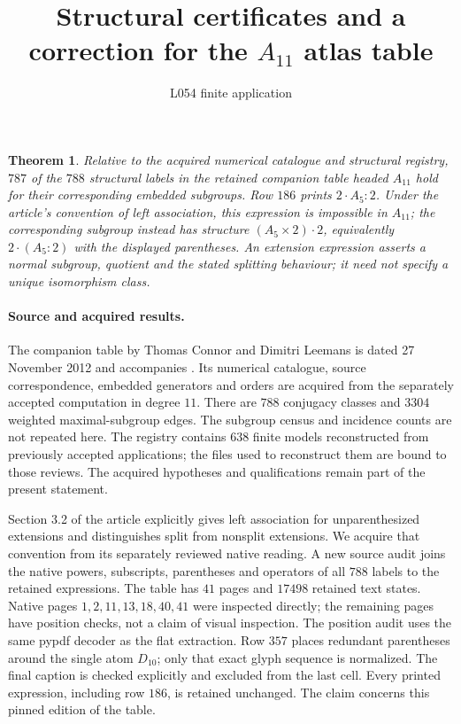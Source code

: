 \documentclass[11pt]{article}
\title{Structural certificates and a correction for the $A_{11}$ atlas table}
\author{L054 finite application}\date{}
\newtheorem{theorem}{Theorem}
\begin{document}
\maketitle

\begin{theorem}
Relative to the acquired numerical catalogue and structural registry,
$787$ of the $788$ structural labels in the retained companion table
headed $A_{11}$ hold for their corresponding embedded subgroups.
Row $186$ prints $2\cdot A_5:2$. Under the article's convention of left
association, this expression is impossible in $A_{11}$; the corresponding
subgroup instead has structure $(A_5\times2)\cdot2$, equivalently
$2\cdot(A_5:2)$ with the displayed parentheses.
An extension expression asserts a normal subgroup, quotient and the
stated splitting behaviour; it need not specify a unique isomorphism class.
\end{theorem}

\paragraph{Source and acquired results.}
The companion table by Thomas Connor and Dimitri Leemans is dated
27 November 2012 and accompanies \cite{atlas}. Its numerical catalogue,
source correspondence, embedded generators and orders are acquired from
the separately accepted computation in degree $11$. There are $788$
conjugacy classes and $3304$ weighted maximal-subgroup edges. The subgroup
census and incidence counts are not repeated here. The registry contains
$638$ finite models reconstructed from previously accepted applications;
the files used to reconstruct them are bound to those reviews. The acquired
hypotheses and qualifications remain part of the present statement.

Section 3.2 of the article explicitly gives left association for
unparenthesized extensions and distinguishes split from nonsplit
extensions. We acquire that convention from its separately reviewed native
reading. A new source audit joins the native powers, subscripts,
parentheses and operators of all $788$ labels to the retained expressions.
The table has $41$ pages and $17498$ retained text states. Native pages
$1,2,11,13,18,40,41$ were inspected directly; the remaining pages have
position checks, not a claim of visual inspection. The position audit uses
the same pypdf decoder as the flat extraction. Row $357$ places redundant
parentheses around the single atom $D_{10}$; only that exact glyph sequence
is normalized. The final caption is checked explicitly and excluded from
the last cell. Every printed expression, including row $186$, is retained
unchanged. The claim concerns this pinned edition of the table.
\end{document}

